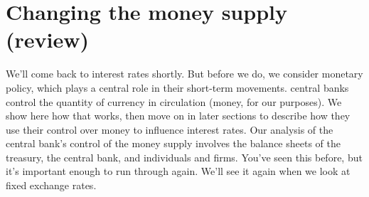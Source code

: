 \section{Changing the money supply (review) }

We'll come back to interest rates shortly.
But before we do, we consider monetary policy,
which plays a central role in their short-term movements.
central banks  control the quantity of currency
in circulation (money, for our purposes).
We show here how that works,
then move on in later sections to describe
how they use their control over money to influence interest rates.
Our analysis of the central bank's  control
of the money supply involves the balance sheets of the treasury,
the central bank, and individuals and firms.
You've seen this before, but it's
important enough to run through again.
We'll see it again when we look at fixed exchange rates.


